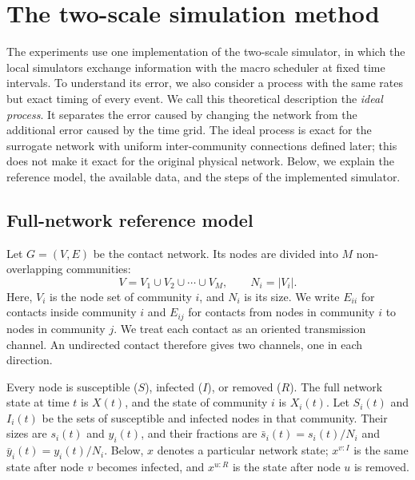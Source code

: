 \documentclass{ieeeaccess}
\newcommand{\ibar}{\bar{y}}
\newcommand{\sbar}{\bar{s}}
\begin{document}
\section{The two-scale simulation method}
\label{sec:method}

The experiments use one implementation of the two-scale simulator, in which the local simulators exchange information with the macro scheduler at fixed time intervals. To understand its error, we also consider a process with the same rates but exact timing of every event. We call this theoretical description the \emph{ideal process}. It separates the error caused by changing the network from the additional error caused by the time grid. The ideal process is exact for the surrogate network with uniform inter-community connections defined later; this does not make it exact for the original physical network. Below, we explain the reference model, the available data, and the steps of the implemented simulator.

\subsection{Full-network reference model}
\label{sec:reference}

Let $G=(V,E)$ be the contact network. Its nodes are divided into $M$ non-overlapping communities:
\begin{equation}
\label{eq:partition}
V=V_1\cup V_2\cup\cdots\cup V_M,
\qquad N_i=|V_i|.
\end{equation}
Here, $V_i$ is the node set of community $i$, and $N_i$ is its size. We write $E_{ii}$ for contacts inside community $i$ and $E_{ij}$ for contacts from nodes in community $i$ to nodes in community $j$. We treat each contact as an oriented transmission channel. An undirected contact therefore gives two channels, one in each direction.

Every node is susceptible ($S$), infected ($I$), or removed ($R$). The full network state at time $t$ is $X(t)$, and the state of community $i$ is $X_i(t)$. Let $S_i(t)$ and $I_i(t)$ be the sets of susceptible and infected nodes in that community. Their sizes are $s_i(t)$ and $y_i(t)$, and their fractions are $\sbar_i(t)=s_i(t)/N_i$ and $\ibar_i(t)=y_i(t)/N_i$. Below, $x$ denotes a particular network state; $x^{v:I}$ is the same state after node $v$ becomes infected, and $x^{u:R}$ is the state after node $u$ is removed.
\end{document}
